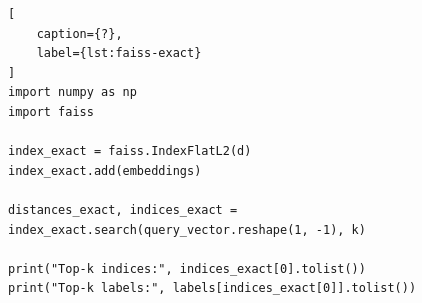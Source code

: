 \begin{lstlisting}[
    caption={?},
    label={lst:faiss-exact}
]
import numpy as np
import faiss

index_exact = faiss.IndexFlatL2(d)
index_exact.add(embeddings)

distances_exact, indices_exact = index_exact.search(query_vector.reshape(1, -1), k)

print("Top-k indices:", indices_exact[0].tolist())
print("Top-k labels:", labels[indices_exact[0]].tolist())
\end{lstlisting}